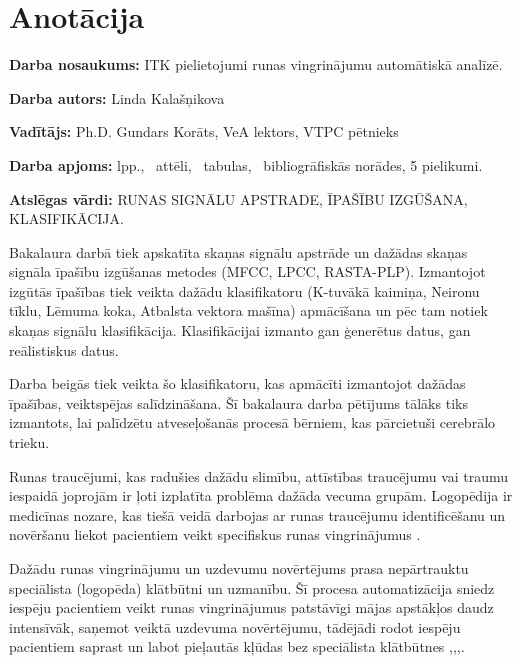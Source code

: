 \documentclass[12pt,paper=A4]{report}
\begin{document}
\tableofcontents

\onehalfspace

\chapter*{Anotācija}
\textbf{Darba nosaukums:} ITK pielietojumi runas vingrinājumu automātiskā analīzē.

\textbf{Darba autors:} Linda Kalašņikova

\textbf{Vadītājs:} Ph.D. Gundars Korāts, VeA lektors, VTPC pētnieks

\textbf{Darba apjoms:} \pageref{LastPage} lpp., \totalfigures\  attēli, \totaltables\ tabulas, \ bibliogrāfiskās norādes, 5 pielikumi.

\textbf{Atslēgas vārdi:} RUNAS SIGNĀLU APSTRADE, ĪPAŠĪBU IZGŪŠANA, KLASIFIKĀCIJA.

\vspace{5mm}

Bakalaura darbā tiek apskatīta skaņas signālu apstrāde un dažādas 
skaņas signāla īpašību izgūšanas metodes (MFCC, LPCC, RASTA-PLP).
Izmantojot izgūtās īpašības tiek veikta dažādu klasifikatoru (K-tuvākā kaimiņa, Neironu tīklu, Lēmuma koka, Atbalsta vektora mašīna) apmācīšana
un pēc tam notiek skaņas signālu klasifikācija. Klasifikācijai izmanto
gan ģenerētus datus, gan reālistiskus datus.

Darba beigās tiek veikta šo klasifikatoru, kas apmācīti izmantojot dažādas 
īpašības, veiktspējas salīdzināšana. Šī bakalaura darba pētījums tālāks tiks izmantots, lai palīdzētu atveseļošanās
procesā bērniem, kas pārcietuši cerebrālo trieku. 

Runas traucējumi, kas radušies dažādu slimību, attīstības traucējumu vai traumu iespaidā joprojām ir ļoti izplatīta problēma dažāda vecuma grupām. Logopēdija ir medicīnas nozare, kas tiešā veidā darbojas ar runas traucējumu identificēšanu un novēršanu liekot pacientiem veikt specifiskus runas vingrinājumus \cite{dtw35}.

Dažādu runas vingrinājumu un uzdevumu novērtējums prasa nepārtrauktu speciālista (logopēda) klātbūtni un uzmanību. Šī procesa automatizācija sniedz iespēju pacientiem veikt runas vingrinājumus patstāvīgi mājas apstākļos daudz intensīvāk, saņemot veiktā uzdevuma novērtējumu, tādējādi rodot iespēju pacientiem saprast un labot pieļautās kļūdas bez speciālista klātbūtnes \cite{dtw34},\cite{dtw33},\cite{dtw32},\cite{dtw31}.
\end{document}
